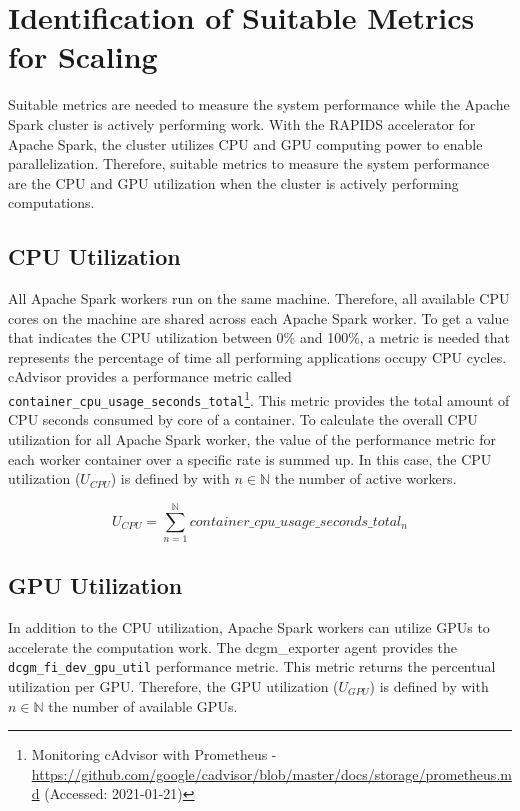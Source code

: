 \section{Identification of Suitable Metrics for Scaling}
\label{sec:05_metrics}
Suitable metrics are needed to measure the system performance while the Apache Spark cluster is actively performing work.
With the RAPIDS accelerator for Apache Spark, the cluster utilizes CPU and GPU computing power to enable parallelization.
Therefore, suitable metrics to measure the system performance are the CPU and GPU utilization when the cluster is actively performing computations.


\subsection{CPU Utilization}
All Apache Spark workers run on the same machine. Therefore, all available CPU cores on the machine are shared across each Apache Spark worker.
%
To get a value that indicates the CPU utilization between 0\% and 100\%, a metric is needed that represents the percentage of time all performing applications occupy CPU cycles.
cAdvisor provides a performance metric called \texttt{container\_cpu\_usage\_seconds\_total}\footnote{Monitoring cAdvisor with Prometheus - \url{https://github.com/google/cadvisor/blob/master/docs/storage/prometheus.md} (Accessed: 2021-01-21)}. This metric provides the total amount of CPU seconds consumed by core of a container. 
To calculate the overall CPU utilization for all Apache Spark worker, the value of the performance metric for each worker container over a specific rate is summed up.
%
In this case, the CPU utilization ($U_{CPU}$) is defined by  with $n \in \mathbb{N}$ the number of active workers.

\begin{equation}
U_{CPU}=\sum_{n=1}^{\mathbb{N}}container\_cpu\_usage\_seconds\_total_{n}
\label{eq:05_metrics_cpu}
\end{equation}

\subsection{GPU Utilization}
%
In addition to the CPU utilization, Apache Spark workers can utilize GPUs to accelerate the computation work.	
The dcgm\_exporter agent provides the \texttt{dcgm\_fi\_dev\_gpu\_util} performance metric. This metric returns the percentual utilization per GPU.
Therefore, the GPU utilization ($U_{GPU}$) is defined by  with $n \in \mathbb{N}$ the number of available GPUs.


